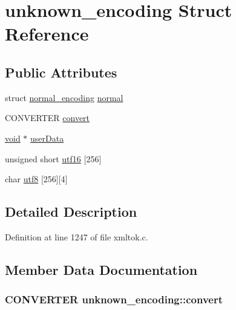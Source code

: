 \hypertarget{structunknown__encoding}{}\section{unknown\+\_\+encoding Struct Reference}
\label{structunknown__encoding}
\subsection*{Public Attributes}
\begin{DoxyCompactItemize}
\item 
struct \hyperlink{structnormal__encoding}{normal\+\_\+encoding} \hyperlink{structunknown__encoding_ae43fb7292b46e2baaac780e67e42fdc3}{normal}
\item 
C\+O\+N\+V\+E\+R\+T\+ER \hyperlink{structunknown__encoding_a7af8f173c0112ce63f8965acda5a7bda}{convert}
\item 
\hyperlink{sound_8c_ae35f5844602719cf66324f4de2a658b3}{void} $\ast$ \hyperlink{structunknown__encoding_addea046f1af692252868f899c0160fa7}{user\+Data}
\item 
unsigned short \hyperlink{structunknown__encoding_a6ed1343e8621126068ba7913d187172f}{utf16} \mbox{[}256\mbox{]}
\item 
char \hyperlink{structunknown__encoding_ae42e3f5d5f65098ea9039b2a35789184}{utf8} \mbox{[}256\mbox{]}\mbox{[}4\mbox{]}
\end{DoxyCompactItemize}


\subsection{Detailed Description}


Definition at line 1247 of file xmltok.\+c.



\subsection{Member Data Documentation}
\subsubsection[{\texorpdfstring{convert}{convert}}]{\setlength{\rightskip}{0pt plus 5cm}C\+O\+N\+V\+E\+R\+T\+ER unknown\+\_\+encoding\+::convert}\hypertarget{structunknown__encoding_a7af8f173c0112ce63f8965acda5a7bda}{}\label{structunknown__encoding_a7af8f173c0112ce63f8965acda5a7bda}


